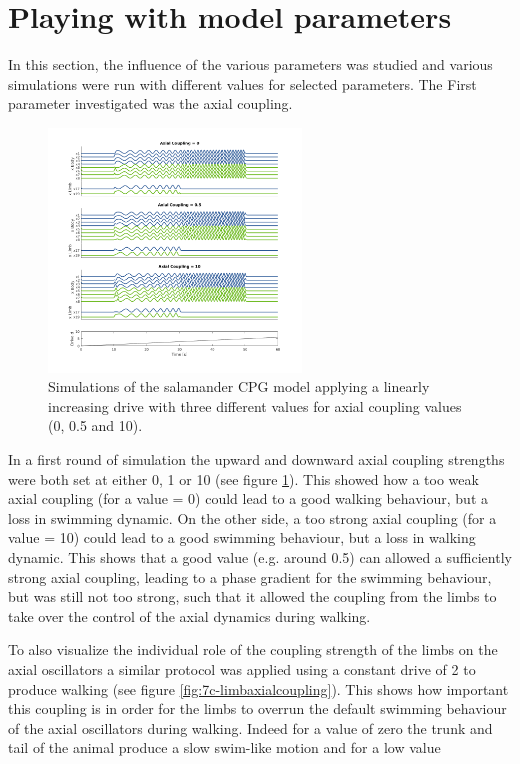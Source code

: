 \documentclass[a4paper]{scrartcl}
\begin{document}
\section{Playing with model parameters}

In this section, the influence of the various parameters was studied and various simulations were run with different values for selected parameters. The First parameter investigated was the axial coupling. 

\begin{figure}[!h]
	\hspace*{-1 cm}
	\includegraphics[width=0.6\textwidth]{fig/figure7c_axial-coupling.png}
	\caption{Simulations of the salamander CPG model applying a linearly increasing drive with three different values for axial coupling values (0, 0.5 and 10).}
	\label{fig:7c-axialcoupling}
\end{figure}

{\setlength{\parindent}{0 cm}
In a first round of simulation the upward and downward axial coupling strengths were both set at either 0, 1 or 10 (see figure \ref{fig:7c-axialcoupling}). This showed how a too weak axial coupling (for a value = 0) could lead to a good walking behaviour, but a loss in swimming dynamic. On the other side, a too strong axial coupling (for a value = 10) could lead to a good swimming behaviour, but a loss in walking dynamic. This shows that a good value (e.g. around 0.5) can allowed a sufficiently strong axial coupling, leading to a phase gradient for the swimming behaviour, but was still not too strong, such that it allowed the coupling from the limbs to take over the control of the axial dynamics during walking.
}

To also visualize the individual role of the coupling strength of the limbs on the axial oscillators a similar protocol was applied using a constant drive of 2 to produce walking (see figure \ref{fig:7c-limbaxialcoupling}). This shows how important this coupling is in order for the limbs to overrun the default swimming behaviour of the axial oscillators during walking. Indeed for a value of zero the trunk and tail of the animal produce a slow swim-like motion and for a low value
\end{document}

